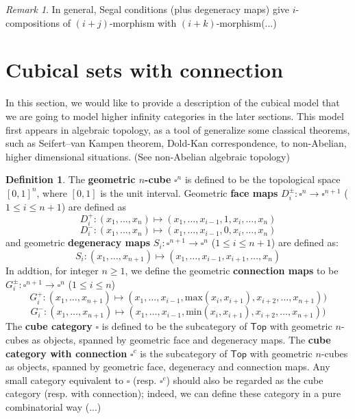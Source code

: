 \documentclass{article}
\theoremstyle{definition}
\newtheorem{mydef}{Definition}[section]
\theoremstyle{remark}
\newtheorem*{remark}{Remark}
\begin{document}
\begin{remark}
In general, Segal conditions (plus degeneracy maps) give $i$-compositions of $(i+j)$-morphism with $(i+k)$-morphism(...)
\end{remark}


\section{Cubical sets with connection}

In this section, we would like to provide a description of the cubical model that we are going to model higher infinity categories in the later sections. This model first appears in algebraic topology, as a tool of generalize some classical theorems, such as Seifert–van Kampen theorem, Dold-Kan correspondence, to non-Abelian, higher dimensional situations. (See non-Abelian algebraic topology)

\begin{mydef}
The \textbf{geometric $n$-cube} $\square^n$ is defined to be the topological space $[0,1]^n$, where $[0,1]$ is the unit interval. Geometric \textbf{face maps} $D^{\pm}_i:\square^n \to \square^{n+1}$ ($1 \leq i \leq n+1$) are defined as $$D^+_i: (x_1,\dots,x_n) \mapsto (x_1,\dots,x_{i-1},1,x_{i},\dots,x_n)$$    $$D^-_i: (x_1,\dots,x_n) \mapsto (x_1,\dots,x_{i-1},0,x_{i},\dots,x_n)$$ and geometric \textbf{degeneracy maps} $S_i:\square^{n+1} \to \square^n$ ($1 \leq i \leq n+1$) are defined as: $$ S_i: (x_1,\dots,x_{n+1}) \mapsto (x_1,\dots,x_{i-1},x_{i+1},\dots,x_n)$$ In addtion, for integer $n \geq 1$, we define the geometric \textbf{connection maps} to be $G^{\pm}_i: \square^{n+1} \to \square^n$ ($1 \leq i \leq n$) $$G^+_i: (x_1,\dots,x_{n+1}) \mapsto (x_1, \dots,x_{i-1},\mathrm{max}(x_i,x_{i+1}),x_{i+2},\dots,x_{n+1})) $$    $$ G^-_i: (x_1,\dots,x_{n+1}) \mapsto (x_1, \dots,x_{i-1},\mathrm{min}(x_i,x_{i+1}),x_{i+2},\dots,x_{n+1})) $$ The \textbf{cube category} $\square$ is defined to be the subcategory of $\mathsf{Top}$ with geometric $n$-cubes as objects, spanned by geometric face and degeneracy maps. The \textbf{cube category with connection} $\square^c$ is the subcategory of $\mathsf{Top}$ with geometric $n$-cubes as objects, spanned by geometric face, degeneracy and connection maps. Any small category equivalent to $\square$ (resp. $\square^c$) should also be regarded as the cube category (resp. with connection); indeed, we can define these category in a pure combinatorial way (...)
\end{mydef}

\appendix
\end{document}
